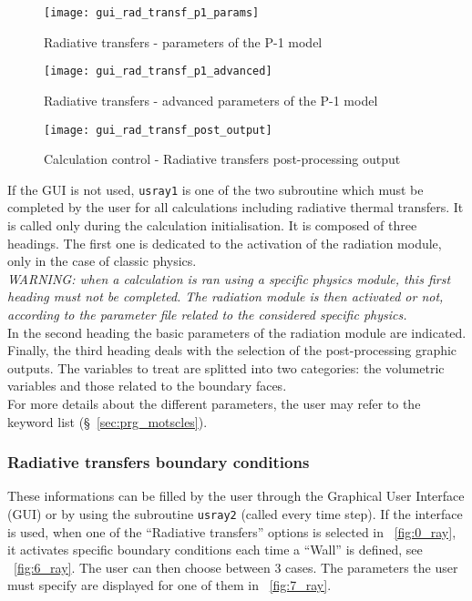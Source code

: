 {{\begin{figure}[ht]
\begin{center}
\texttt{[image: gui\_rad\_transf\_p1\_params]}
\caption{Radiative transfers - parameters of the P-1 model}
\label{fig:3_ray}
\end{center}
\end{figure}

\begin{figure}[ht]
\begin{center}
\texttt{[image: gui\_rad\_transf\_p1\_advanced]}
\caption{Radiative transfers - advanced parameters of the P-1 model}
\label{fig:4_ray}
\end{center}
\end{figure}

\begin{figure}[ht]
\begin{center}
\texttt{[image: gui\_rad\_transf\_post\_output]}
\caption{Calculation control - Radiative transfers post-processing output}
\label{fig:5_ray}
\end{center}
\end{figure}

If the GUI is not used, \texttt{usray1} is one of the two subroutine which must be completed by the user for all
calculations including radiative thermal transfers. It is called only during the calculation initialisation. It is composed of three headings. The first one is dedicated to the activation
of the radiation module, only in the case of classic physics. \\
{\em WARNING: when a calculation is ran using a specific physics module,
this first heading must not be completed. The radiation module is then
activated or not, according to the parameter file related to the considered
specific physics.} \\

\noindent
In the second heading the basic parameters of the radiation module are indicated.\\
Finally, the third heading deals with the selection of the
post-processing graphic outputs. The variables to treat are splitted
into two categories: the volumetric variables and those related to the
boundary faces.\\

\noindent
For more details about the different parameters, the user may refer to the
keyword list (\S~\ref{sec:prg_motscles}).


\subsubsection{Radiative transfers boundary conditions}
These informations can be filled by the user through the Graphical User Interface (GUI) or by using the subroutine \texttt{usray2} (called every time step). If the interface is used, when one of the ``Radiative transfers'' options is selected in \figurename~\ref{fig:0_ray}, it activates specific boundary conditions each time a ``Wall'' is defined, see \figurename~\ref{fig:6_ray}. The user can then choose between 3 cases. The parameters the user must specify are displayed for one of them in \figurename~\ref{fig:7_ray}.

}}
